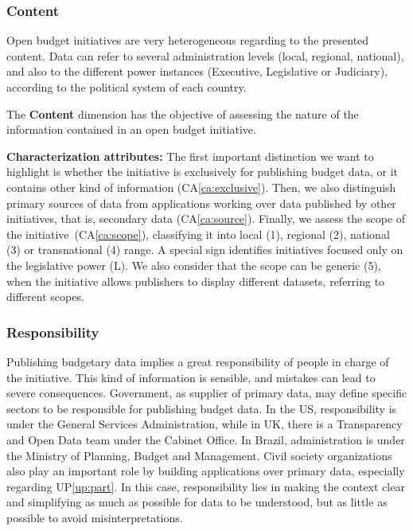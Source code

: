 \vspace{.1cm}
	\subsubsection{Content}
	\label{dim:content}
Open budget initiatives are very heterogeneous regarding to the presented content. 
Data can refer to several administration levels (local, regional, national), and also to the different power instances (Executive, Legislative or Judiciary), according to the political system of each country.

		\begin{defn}The \textbf{Content} dimension has the objective of assessing the nature of the information contained in an open budget initiative.
		\end{defn}
		\noindent\textbf{Characterization attributes:}
The first important distinction we want to highlight is whether the initiative is exclusively for publishing budget data, or it contains other kind of information (CA\ref{ca:exclusive}). 
Then, we also distinguish primary sources of data from applications working over data published by other initiatives, that is, secondary data (CA\ref{ca:source}). 
Finally, we assess the scope of the initiative~(CA\ref{ca:scope}), classifying it into local (1), regional (2), national (3) or transnational (4) range.
A special sign identifies initiatives focused only on the legislative power (L).
We also consider that the scope can be generic (5), when the initiative allows publishers to display different datasets, referring to different scopes.

\vspace{.1cm}
	\subsubsection{Responsibility}
Publishing budgetary data implies a great responsibility of people in charge of the initiative.
This kind of information is sensible, and mistakes can lead to severe consequences. 
Government, as supplier of primary data, may define specific sectors to be responsible for publishing budget data. 
In the US, responsibility is under the General Services Administration, while in UK, there is a Transparency and Open Data team under the Cabinet Office. 
In Brazil, administration is under the Ministry of Planning, Budget and Management.
Civil society organizations also play an important role by building applications over primary data, especially regarding UP\ref{up:part}.
In this case, responsibility lies in making the context clear and simplifying as much as possible for data to be understood, but as little as possible to avoid misinterpretations.

